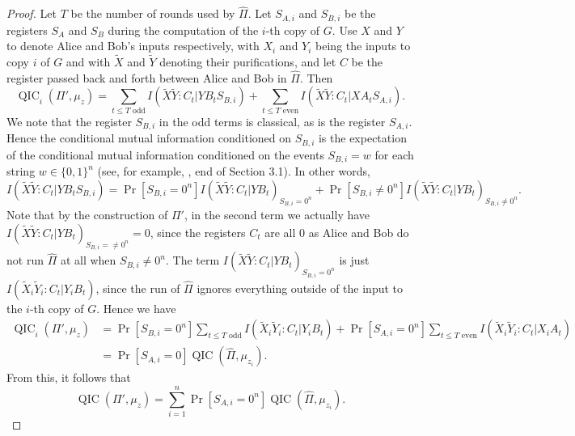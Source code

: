 \documentclass[10pt,a4paper]{article}
\theoremstyle{definition}
\newcommand{\B}{\{0,1\}}
\renewcommand{\>}{\rangle}
\newcommand{\<}{\langle}
\newcommand{\tX}{\widetilde{X}}
\newcommand{\tY}{\widetilde{Y}}
\DeclareMathOperator{\QIC}{QIC}
\begin{document}
\begin{proof}
Let $T$ be the number of rounds used by $\hat{\Pi}$.
Let $S_{A,i}$ and $S_{B,i}$ be the registers $S_A$ and $S_B$
during the computation of the $i$-th copy of $G$. 
Use $X$ and $Y$ to denote Alice and Bob's inputs respectively,
with $X_i$ and $Y_i$ being the inputs to copy $i$ of $G$
and with $\tilde{X}$ and $\tilde{Y}$ denoting their purifications,
and let $C$ be the register passed back and forth between
Alice and Bob in $\hat{\Pi}$. Then
\[\QIC_i(\Pi',\mu_z)=
\sum_{t\le T\text{ odd}} I(\tX\tY:C_t|YB_t S_{B,i})
+\sum_{t\le T\text{ even}}I(\tX\tY:C_t|XA_t S_{A,i}).\]
We note that the register $S_{B,i}$ in the odd terms is classical,
as is the register $S_{A,i}$. Hence the conditional
mutual information conditioned on $S_{B,i}$ is the expectation
of the conditional mutual information conditioned on the events
$S_{B,i}=w$ for each string $w\in\B^n$ (see, for example,
\cite{BGK+18}, end of Section 3.1). In other words,
\[I(\tX\tY:C_t|YB_t S_{B,i})=
\Pr[S_{B,i}=0^n] I(\tX\tY:C_t|YB_t)_{S_{B,i}=0^n}
+\Pr[S_{B,i}\ne 0^n] I(\tX\tY:C_t|YB_t)_{S_{B,i}\ne 0^n}.\]
Note that by the construction of $\Pi'$, in the second term
we actually have $I(\tX\tY:C_t|YB_t)_{S_{B,i}=\ne 0^n}=0$,
since the registers $C_t$ are all $0$ as Alice and Bob do not
run $\hat{\Pi}$ at all when $S_{B,i}\ne 0^n$.
The term $I(\tX\tY:C_t|YB_t)_{S_{B,i}=0^n}$
is just $I(\tX_i\tY_i:C_t|Y_iB_t)$, since
the run of $\hat{\Pi}$ ignores everything outside of the input
to the $i$-th copy of $G$. Hence we have
\begin{align*}
\QIC_i(\Pi',\mu_z)&=
\Pr[S_{B,i}=0^n]\sum_{t\le T\text{ odd}}I(\tX_i\tY_i:C_t|Y_iB_t)
+\Pr[S_{A,i}=0^n]
\sum_{t\le T\text{ even}}I(\tX_i\tY_i:C_t|X_iA_t)\\
&=\Pr[S_{A,i}=0]\QIC(\hat{\Pi},\mu_{z_i}).
\end{align*}
From this, it follows that
\[\QIC(\Pi',\mu_z)=\sum_{i=1}^n \Pr[S_{A,i}=0^n]\QIC(\hat{\Pi},\mu_{z_i}).\]


\end{proof}
\end{document}
